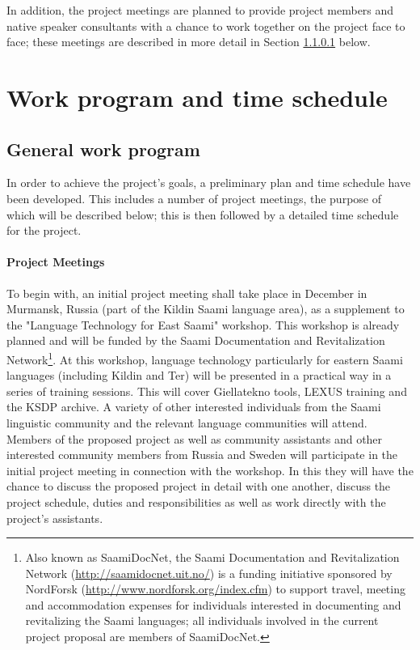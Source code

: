 \documentclass[a4paper,12pt]{article}
\begin{document}
{{{{In addition, the project meetings are planned to provide project members and native speaker consultants with a chance to work together on the project face to face; these meetings are described in more detail in Section \ref{meetings} below.

\section{Work program and time schedule}
\subsection{General work program}

In order to achieve the project's goals, a preliminary plan and time schedule have been developed. This includes a number of project meetings, the purpose of which will be described below; this is then followed by a detailed time schedule for the project.

\paragraph{Project Meetings}\label{meetings}
To begin with, an initial project meeting shall take place in December in Murmansk, Russia (part of the Kildin Saami language area), as a supplement to the "Language Technology for East Saami" workshop. This workshop is already planned and will be funded by the Saami Documentation and Revitalization Network\footnote{Also known as SaamiDocNet, the Saami Documentation and Revitalization Network (\url{http://saamidocnet.uit.no/}) is a funding initiative sponsored by NordForsk (\url{http://www.nordforsk.org/index.cfm}) to support travel, meeting and accommodation expenses for individuals interested in documenting and revitalizing the Saami languages; all individuals involved in the current project proposal are members of SaamiDocNet.}. At this workshop, language technology particularly for eastern Saami languages (including Kildin and Ter) will be presented in a practical way in a series of training sessions. This will cover Giellatekno tools, LEXUS training and the KSDP archive. A variety of other interested individuals from the Saami linguistic community and the relevant language communities will attend. Members of the proposed project as well as community assistants and other interested community members from Russia and Sweden will participate in the initial project meeting in connection with the workshop. In this they will have the chance to discuss the proposed project in detail with one another, discuss the project schedule, duties and responsibilities as well as work directly with the project's assistants.

}}}}
\end{document}
